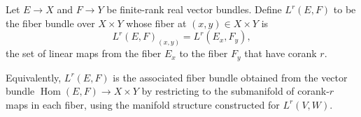 Let $E \to X$ and $F \to Y$ be finite-rank real vector bundles. Define $L^r(E, F)$ to be the fiber bundle over $X \times Y$ whose fiber at $(x, y) \in X \times Y$ is
$$
L^r(E, F)_{(x,y)} = L^r(E_x, F_y),
$$
the set of linear maps from the fiber $E_x$ to the fiber $F_y$ that have corank $r$.

Equivalently, $L^r(E, F)$ is the associated fiber bundle obtained from the vector bundle $\operatorname{Hom}(E, F) \to X \times Y$ by restricting to the submanifold of corank-$r$ maps in each fiber, using the manifold structure constructed for $L^r(V, W)$.
